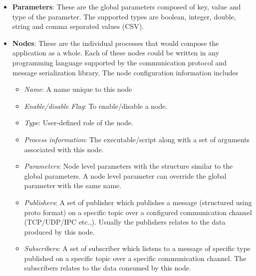 \begin{itemize}[leftmargin={0.5cm},topsep={0pt},itemsep={0pt},partopsep={0pt},parsep={0pt}]
\item \textbf{Parameters}: These are the global parameters composed of key, value and type of the parameter. The supported types are boolean, integer, double, string and comma separated values (CSV). 
\item \textbf{Nodes}: These are the individual processes that would compose the application as a whole. Each of these nodes could be written in any programming language supported by the communication protocol and message serialization library. The node configuration information includes
\begin{itemize}
\item \emph{Name}: A name unique to this node
\item \emph{Enable/disable Flag}: To enable/disable a node.
\item \emph{Type}: User-defined role of the node.
\item \emph{Process information}: The executable/script along with a set of arguments associated with this node.
\item \emph{Parameters}: Node level parameters with the structure similar to the global parameters. A node level parameter can override the global parameter with the same name.
\item \emph{Publishers}: A set of publisher which publishes a message (structured using proto format) on a specific topic over a configured communication channel (TCP/UDP/IPC etc.,). Usually the publishers relates to the data produced by this node.
\item \emph{Subscribers}: A set of subscriber which listens to a message of specific type published on a specific topic over a specific communication channel. The subscribers relates to the data consumed by this node.
\end{itemize}
\end{itemize}
